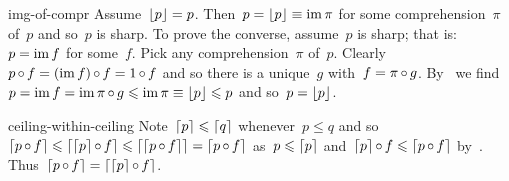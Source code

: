 \begin{solution}{img-of-compr}%
Assume~$\floor{p} = p$.
    Then~$p = \floor{p} \equiv \IM \pi$ for some comprehension~$\pi$ of~$p$
        and so~$p$ is sharp.
To prove the converse, assume~$p$ is sharp;
    that is: $p = \IM f$ for some~$f$.
Pick any comprehension~$\pi$ of~$p$.
    Clearly~$p \after f = (\IM f) \after f = 1 \after f$
        and so there is a unique~$g$ with~$f = \pi \after g$.
    By~
        we find~$p = \IM f = \IM \pi \after g \leq \IM \pi \equiv \floor{p} \leq p$
        and so~$p = \floor{p}$.
\end{solution}
\begin{solution}{ceiling-within-ceiling}%
Note~$\ceil{p} \leq \ceil{q}$  whenever~$p \leq q$
    and so~$\ceil{p \after f} \leq \ceil{\ceil{p} \after f}
        \leq \ceil{\ceil{p \after f}} = \ceil{p \after f}$
        as~$p \leq \ceil{p}$
        and~$\ceil{p} \after f \leq \ceil{p \after f}$ by~.
    Thus~$\ceil{p \after f} = \ceil{\ceil{p} \after f}$.
\end{solution}

